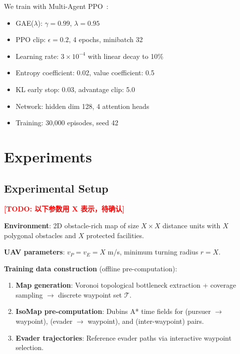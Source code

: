 \documentclass[10pt,conference]{IEEEtran}
\newcommand{\marktodo}[1]{\textcolor{red}{\textbf{[TODO: #1]}}}
\begin{document}
We train with Multi-Agent PPO~\cite{yu2022surprising}:
\begin{itemize}
    \item GAE($\lambda$): $\gamma = 0.99$, $\lambda = 0.95$
    \item PPO clip: $\epsilon = 0.2$, 4 epochs, minibatch 32
    \item Learning rate: $3 \times 10^{-4}$ with linear decay to 10\%
    \item Entropy coefficient: 0.02, value coefficient: 0.5
    \item KL early stop: 0.03, advantage clip: 5.0
    \item Network: hidden dim 128, 4 attention heads
    \item Training: 30,000 episodes, seed 42
\end{itemize}

\section{Experiments}

\subsection{Experimental Setup}

\marktodo{以下参数用 X 表示，待确认}

\textbf{Environment}: 2D obstacle-rich map of size $X \times X$ distance units with $X$ polygonal obstacles and $X$ protected facilities.

\textbf{UAV parameters}: $v_P = v_E = X$ m/s, minimum turning radius $r = X$.

\textbf{Training data construction} (offline pre-computation):
\begin{enumerate}
    \item \textbf{Map generation}: Voronoi topological bottleneck extraction + coverage sampling $\rightarrow$ discrete waypoint set $\mathcal{T}$.
    \item \textbf{IsoMap pre-computation}: Dubins A* time fields for (pursuer $\rightarrow$ waypoint), (evader $\rightarrow$ waypoint), and (inter-waypoint) pairs.
    \item \textbf{Evader trajectories}: Reference evader paths via interactive waypoint selection.
\end{enumerate}
\end{document}
